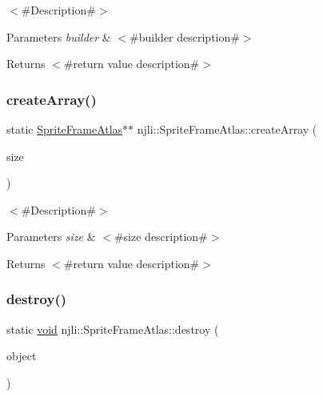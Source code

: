 $<$\#\+Description\#$>$


\begin{DoxyParams}{Parameters}
{\em builder} & $<$\#builder description\#$>$\\
\hline
\end{DoxyParams}
\begin{DoxyReturn}{Returns}
$<$\#return value description\#$>$ 
\end{DoxyReturn}
\mbox{\label{classnjli_1_1_sprite_frame_atlas_abd9a8d6350ab19df8121b22e85493e4c}} 
\subsubsection{\texorpdfstring{create\+Array()}{createArray()}}
{\footnotesize\ttfamily static \mbox{\hyperlink{classnjli_1_1_sprite_frame_atlas}{Sprite\+Frame\+Atlas}}$\ast$$\ast$ njli\+::\+Sprite\+Frame\+Atlas\+::create\+Array (\begin{DoxyParamCaption}\item[{const \mbox{\hyperlink{_util_8h_a10e94b422ef0c20dcdec20d31a1f5049}{u32}}}]{size }\end{DoxyParamCaption})\hspace{0.3cm}{\ttfamily [static]}}

$<$\#\+Description\#$>$


\begin{DoxyParams}{Parameters}
{\em size} & $<$\#size description\#$>$\\
\hline
\end{DoxyParams}
\begin{DoxyReturn}{Returns}
$<$\#return value description\#$>$ 
\end{DoxyReturn}
\mbox{\label{classnjli_1_1_sprite_frame_atlas_aa585303baeeb8d6df78d1ae1acc61c20}} 
\subsubsection{\texorpdfstring{destroy()}{destroy()}}
{\footnotesize\ttfamily static \mbox{\hyperlink{_thread_8h_af1e856da2e658414cb2456cb6f7ebc66}{void}} njli\+::\+Sprite\+Frame\+Atlas\+::destroy (\begin{DoxyParamCaption}\item[{\mbox{\hyperlink{classnjli_1_1_sprite_frame_atlas}{Sprite\+Frame\+Atlas}} $\ast$}]{object }\end{DoxyParamCaption})\hspace{0.3cm}{\ttfamily [static]}}

